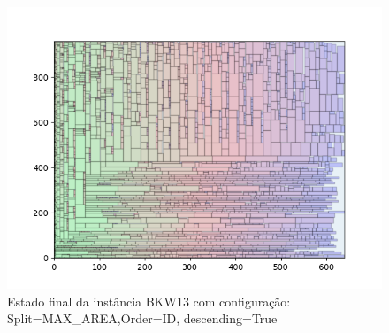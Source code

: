 \begin{figure}[H]
    \centering
    \caption[]{Estado final da instância BKW13 com configuração: Split=MAX_AREA,Order=ID, descending=True}
    \label{fig:bkw13-max_area-id-true}
    \includegraphics[scale=0.5]{output/figures/bkw/bkw13/max_area/id/true/0000}
\end{figure}